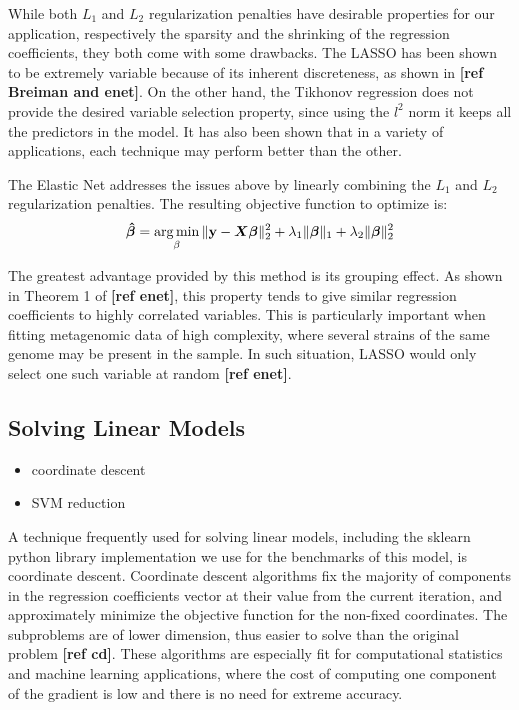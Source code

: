 While both $L_1$ and $L_2$ regularization penalties have desirable properties for our application, respectively the sparsity and the shrinking of the regression coefficients, they both come with some drawbacks. The LASSO has been shown to be extremely variable because of its inherent discreteness, as shown in \textbf{[ref Breiman and enet]}. On the other hand, the Tikhonov regression does not provide the desired variable selection property, since using the $l^2$ norm it keeps all the predictors in the model. It has also been shown that in a variety of applications, each technique may perform better than the other.

The Elastic Net addresses the issues above by linearly combining the $L_1$ and $L_2$ regularization penalties. The resulting objective function to optimize is:
\begin{equation*}
    \boldsymbol{\hat{\beta}} = \operatorname*{arg\,min}_{\beta}{\lVert\mathbf{y} - \boldsymbol{X}\boldsymbol{\beta}\rVert_2^2} + \lambda_1 \lVert\boldsymbol{\beta}\rVert_1 + \lambda_2\lVert\boldsymbol{\beta}\rVert_2^2
\end{equation*}

The greatest advantage provided by this method is its grouping effect. As shown in Theorem 1 of \textbf{[ref enet]}, this property tends to give similar regression coefficients to highly correlated variables. This is particularly important when fitting metagenomic data of high complexity, where several strains of the same genome may be present in the sample. In such situation, LASSO would only select one such variable at random \textbf{[ref enet]}.

\subsection{Solving Linear Models}
\begin{itemize}
    \item coordinate descent
    \item SVM reduction
\end{itemize}
A technique frequently used for solving linear models, including the sklearn python library implementation we use for the benchmarks of this model, is coordinate descent. Coordinate descent algorithms fix the majority of components in the regression coefficients vector at their value from the current iteration, and approximately minimize the objective function for the non-fixed coordinates. The subproblems are of lower dimension, thus easier to solve than the original problem \textbf{[ref cd]}. These algorithms are especially fit for computational statistics and machine learning applications, where the cost of computing one component of the gradient is low and there is no need for extreme accuracy.

